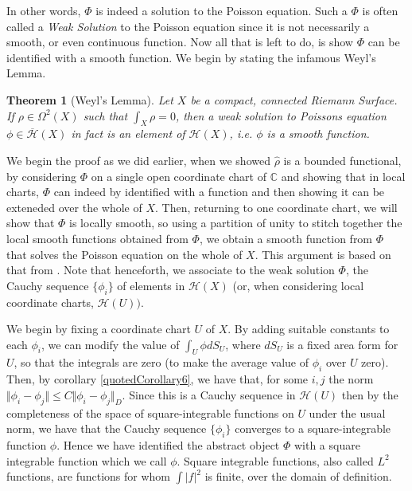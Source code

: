 \documentclass[11pt]{report}
\newtheorem{thm}{Theorem}[section]
\theoremstyle{definition}
\begin{document}
In other words, $\Phi$ is indeed a solution to the Poisson equation. Such a $\Phi$ is often called a \emph{Weak Solution} to the Poisson equation since it is not necessarily a smooth, or even continuous function.
Now all that is left to do, is show $\Phi$ can be identified with a smooth function. We begin by stating the infamous Weyl's Lemma.
\begin{thm}[Weyl's Lemma]\label{WeylsLemmaCompact}
  Let $X$ be a compact, connected Riemann Surface. If $\rho \in \Omega^2(X)$ such that $\int_X \rho = 0$, then a weak solution to Poissons equation $\phi \in \overline{\mathcal{H}}(X)$ in fact is an element of $\mathcal{H}(X)$, i.e. $\phi$ is a smooth function.
\end{thm}

We begin the proof as we did earlier, when we showed $\hat{\rho}$ is a bounded functional, by considering $\Phi$ on a single open coordinate chart of $\mathbb{C}$ and showing that in local charts, $\Phi$ can indeed by identified with a function and then showing it can be exteneded over the whole of $X$. Then, returning to one coordinate chart, we will show that $\Phi$ is locally smooth, so using a partition of unity to stitch together the local smooth functions obtained from $\Phi$, we obtain a smooth function from $\Phi$ that solves the Poisson equation on the whole of $X$. This argument is based on that from \cite[(Chapter 10)]{donaldson}. Note that henceforth, we associate to the weak solution $\Phi$, the Cauchy sequence $\{\phi_i\}$ of elements in $\mathcal{H}(X)$ (or, when considering local coordinate charts, $\mathcal{H}(U))$.


We begin by fixing a coordinate chart $U$ of $X$. By adding suitable constants to each $\phi_i$, we can modify the value of $\int_{U} \phi dS_{U}$, where $dS_{U}$ is a fixed area form for $U$, so that the integrals are zero (to make the average value of $\phi_i$ over $U$ zero). Then, by corollary \ref{quotedCorollary6}, we have that, for some $i,j$ the norm $\Vert \phi_i - \phi_j\Vert \leq C \Vert \phi_i - \phi_j\Vert_D$. Since this is a Cauchy sequence in $\mathcal{H}(U)$ then by the completeness of the space of square-integrable functions on $U$ under the usual norm, we have that the Cauchy sequence $\{\phi_i\}$ converges to a square-integrable function $\phi$. Hence we have identified the abstract object $\Phi$ with a square integrable function which we call $\phi$. Square integrable functions, also called $L^2$ functions, are functions for whom $\int |f|^2$ is finite, over the domain of definition.
\end{document}
